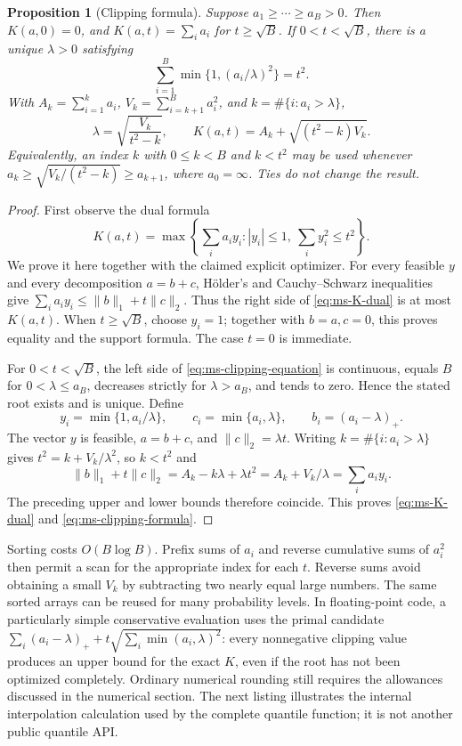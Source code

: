 \documentclass[11pt,letterpaper]{article}
\numberwithin{equation}{section}
\newtheorem{proposition}[theorem]{Proposition}
\theoremstyle{definition}
\theoremstyle{remark}
\begin{document}
\begin{proposition}[Clipping formula]
\label{prop:ms-clipping}
Suppose $a_1\ge\cdots\ge a_B>0$. Then $K(a,0)=0$, and
$K(a,t)=\sum_i a_i$ for $t\ge\sqrt B$. If $0<t<\sqrt B$, there is a
unique $\lambda>0$ satisfying
\begin{equation}
 \sum_{i=1}^B\min\{1,(a_i/\lambda)^2\}=t^2.
 \label{eq:ms-clipping-equation}
\end{equation}
With $A_k=\sum_{i=1}^k a_i$, $V_k=\sum_{i=k+1}^B a_i^2$, and
$k=\#\{i:a_i>\lambda\}$,
\begin{equation}
 \lambda=\sqrt{\frac{V_k}{t^2-k}},\qquad
 K(a,t)=A_k+\sqrt{(t^2-k)V_k}.
 \label{eq:ms-clipping-formula}
\end{equation}
Equivalently, an index $k$ with $0\le k<B$ and $k<t^2$ may be used whenever
$a_k\ge\sqrt{V_k/(t^2-k)}\ge a_{k+1}$, where $a_0=\infty$.
Ties do not change the result.
\end{proposition}
\begin{proof}
First observe the dual formula
\begin{equation}
 K(a,t)=\max\left\{\sum_i a_i y_i:
                    |y_i|\le1,\ \sum_i y_i^2\le t^2\right\}.
 \label{eq:ms-K-dual}
\end{equation}
We prove it here together with the claimed explicit optimizer. For every
feasible $y$ and every decomposition $a=b+c$, H\"older's and
Cauchy--Schwarz inequalities give
$\sum_i a_i y_i\le\|b\|_1+t\|c\|_2$. Thus the right side of
\eqref{eq:ms-K-dual} is at most $K(a,t)$.
When $t\ge\sqrt B$, choose $y_i=1$; together with $b=a,c=0$, this proves
equality and the support formula. The case $t=0$ is immediate.

For $0<t<\sqrt B$, the left side of
\eqref{eq:ms-clipping-equation} is continuous, equals $B$ for
$0<\lambda\le a_B$, decreases strictly for $\lambda>a_B$, and tends to
zero. Hence the stated root exists and is unique. Define
\[
 y_i=\min\{1,a_i/\lambda\},\qquad
 c_i=\min\{a_i,\lambda\},\qquad b_i=(a_i-\lambda)_+.
\]
The vector $y$ is feasible, $a=b+c$, and $\|c\|_2=\lambda t$.
Writing $k=\#\{i:a_i>\lambda\}$ gives
$t^2=k+V_k/\lambda^2$, so $k<t^2$ and
\[
 \|b\|_1+t\|c\|_2
 =A_k-k\lambda+\lambda t^2
 =A_k+V_k/\lambda
 =\sum_i a_i y_i.
\]
The preceding upper and lower bounds therefore coincide. This proves
\eqref{eq:ms-K-dual} and \eqref{eq:ms-clipping-formula}.
\end{proof}

Sorting costs $O(B\log B)$. Prefix sums of $a_i$ and reverse cumulative
sums of $a_i^2$ then permit a scan for the appropriate index for each $t$.
Reverse sums avoid obtaining a small $V_k$ by subtracting two nearly equal
large numbers. The same sorted arrays can be reused for many probability
levels. In floating-point code, a particularly simple conservative
evaluation uses the primal candidate
$\sum_i(a_i-\lambda)_++t\sqrt{\sum_i\min(a_i,\lambda)^2}$:
every nonnegative clipping value produces an upper bound for the exact
$K$, even if the root has not been optimized completely. Ordinary numerical
rounding still requires the allowances discussed in the numerical section.
The next listing illustrates the internal interpolation calculation used
by the complete quantile function; it is not another public quantile API.
\end{document}
